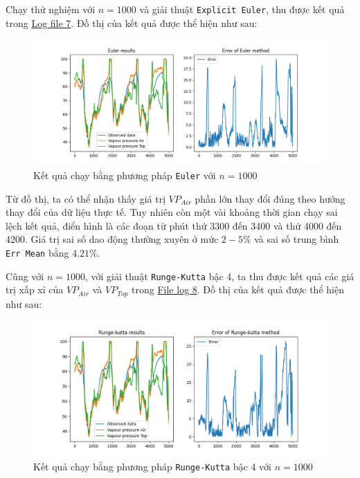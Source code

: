 \documentclass[a4paper]{article}
\begin{document}
Chạy thử nghiệm với $n = 1000$ và giải thuật \texttt{Explicit Euler}, thu được kết quả trong \href{https://files.catbox.moe/nzvkum.txt}{Log file 7}. Đồ thị của kết quả được thể hiện như sau:

\begin{figure}[H]
    \centering
    \includegraphics[width=1.0\textwidth]{eul_1000.png}
    \caption{Kết quả chạy bằng phương pháp \texttt{Euler} với $n=1000$}
    \label{fig:eul_1000}
\end{figure}

Từ đồ thị, ta có thể nhận thấy giá trị $VP_{Air}$ phần lớn thay đổi đúng theo hướng thay đổi của dữ liệu thực tế. Tuy nhiên còn một vài khoảng thời gian chạy sai lệch kết quả, điển hình là các đoạn từ phút thứ 3300 đến 3400 và thứ 4000 đến 4200. Giá trị sai số dao động thường xuyên ở mức $2-5\%$ và sai số trung bình  \texttt{Err Mean} bằng $4.21\%$.

\newpage

Cũng với $n=1000$, với giải thuật \texttt{Runge-Kutta} bậc 4, ta thu được kết quả các giá trị xấp xỉ của $VP_{Air}$ và $VP_{Top}$ trong \href{https://files.catbox.moe/abj30p.txt}{File log 8}. Đồ thị của kết quả được thể hiện như sau:

\begin{figure}[!h]
    \centering
    \includegraphics[width=1.0\textwidth]{rk4_1000.png}
    \caption{Kết quả chạy bằng phương pháp \texttt{Runge-Kutta} bậc 4 với $n=1000$}
    \label{fig:rk4_1000}
\end{figure}
\end{document}
